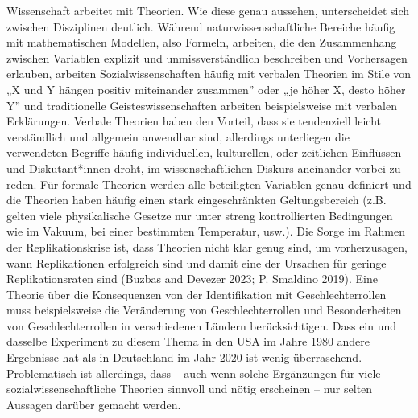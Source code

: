 \documentclass[
  letterpaper,
  DIV=11,
  numbers=noendperiod]{scrreprt}
\begin{document}
Wissenschaft arbeitet mit Theorien. Wie diese genau aussehen,
unterscheidet sich zwischen Disziplinen deutlich. Während
naturwissenschaftliche Bereiche häufig mit mathematischen Modellen, also
Formeln, arbeiten, die den Zusammenhang zwischen Variablen explizit und
unmissverständlich beschreiben und Vorhersagen erlauben, arbeiten
Sozialwissenschaften häufig mit verbalen Theorien im Stile von „X und Y
hängen positiv miteinander zusammen'' oder „je höher X, desto höher Y''
und traditionelle Geisteswissenschaften arbeiten beispielsweise mit
verbalen Erklärungen. Verbale Theorien haben den Vorteil, dass sie
tendenziell leicht verständlich und allgemein anwendbar sind, allerdings
unterliegen die verwendeten Begriffe häufig individuellen, kulturellen,
oder zeitlichen Einflüssen und Diskutant*innen droht, im
wissenschaftlichen Diskurs aneinander vorbei zu reden. Für formale
Theorien werden alle beteiligten Variablen genau definiert und die
Theorien haben häufig einen stark eingeschränkten Geltungsbereich (z.B.
gelten viele physikalische Gesetze nur unter streng kontrollierten
Bedingungen wie im Vakuum, bei einer bestimmten Temperatur, usw.). Die
Sorge im Rahmen der Replikationskrise ist, dass Theorien nicht klar
genug sind, um vorherzusagen, wann Replikationen erfolgreich sind und
damit eine der Ursachen für geringe Replikationsraten sind (Buzbas and
Devezer 2023; P. Smaldino 2019). Eine Theorie über die Konsequenzen von
der Identifikation mit Geschlechterrollen muss beispielsweise die
Veränderung von Geschlechterrollen und Besonderheiten von
Geschlechterrollen in verschiedenen Ländern berücksichtigen. Dass ein
und dasselbe Experiment zu diesem Thema in den USA im Jahre 1980 andere
Ergebnisse hat als in Deutschland im Jahr 2020 ist wenig überraschend.
Problematisch ist allerdings, dass -- auch wenn solche Ergänzungen für
viele sozialwissenschaftliche Theorien sinnvoll und nötig erscheinen --
nur selten Aussagen darüber gemacht werden.
\end{document}
